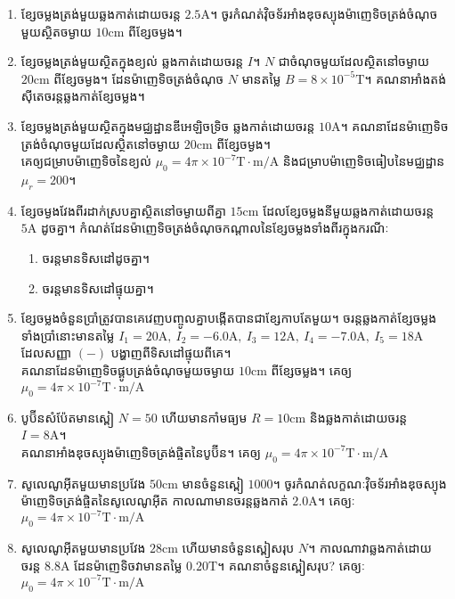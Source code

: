 \begin{enumerate}
	\item ខ្សែចម្លងត្រង់មួយឆ្លងកាត់ដោយចរន្ត $2.5\si{\ampere}$។ ចូរកំណត់វ៉ិចទ័រអាំងឌុចស្យុងម៉ាញេទិចត្រង់ចំណុចមួយស្ថិតចម្ងាយ $10\si{\centi\metre}$ ពីខ្សែចម្ងង។
	\item ខ្សែចម្លងត្រង់មួយស្ថិតក្នុងខ្យល់ ឆ្លងកាត់ដោយចរន្ត $I$។ $N$ ជាចំណុចមួយដែលស្ថិតនៅចម្ងាយ $20\si{\centi\metre}$ ពីខ្សែចម្ងង។ ដែនម៉ាញេទិចត្រង់ចំណុច $N$ មានតម្លៃ $B=8\times 10^{-5}\si{\tesla}$។ គណនាអាំងតង់ស៊ីតេចរន្តឆ្លងកាត់ខ្សែចម្លង។
	\item ខ្សែចម្លងត្រង់មួយស្ថិតក្នុងមជ្ឈដ្ឋានឌីអេឡិចទ្រិច ឆ្លងកាត់ដោយចរន្ត $10\si{\ampere}$។ គណនាដែនម៉ាញេទិចត្រង់ចំណុចមួយដែលស្ថិតនៅចម្ងាយ $20\si{\centi\metre}$ ពីខ្សែចម្ងង។\\ គេឲ្យជម្រាបម៉ាញេទិចនៃខ្យល់ $\mu_{0}=4\pi\times10^{-7}\si{\tesla\cdot\metre/\ampere}$ និងជម្រាបម៉ាញេទិចធៀបនៃមជ្ឈដ្ឋាន $\mu_{r}=200$។
	\item ខ្សែចម្ងងវែងពីរដាក់ស្របគ្នាស្ថិតនៅចម្ងាយពីគ្នា $15\si{\centi\metre}$ ដែលខ្សែចម្លងនីមួយឆ្លងកាត់ដោយចរន្ត $5\si{\ampere}$ ដូចគ្នា។ កំណត់ដែនម៉ាញេទិចត្រង់ចំណុចកណ្តាលនៃខ្សែចម្លងទាំងពីរក្នុងករណីៈ
	\begin{enumerate}[k,2]
		\item ចរន្តមានទិសដៅដូចគ្នា។
		\item ចរន្តមានទិសដៅផ្ទុយគ្នា។
	\end{enumerate}
	\item ខ្សែចម្លងចំនួនប្រាំត្រូវបានគេវេញបញ្ចូលគ្នាបង្កើតបានជាខ្សែកាបតែមួយ។ ចរន្តឆ្លងកាត់ខ្សែចម្លងទាំងប្រាំនោះមានតម្លៃ $I_{1}=20\si{\ampere},~I_{2}=-6.0\si{\ampere},~I_{3}=12\si{\ampere},~I_{4}=-7.0\si{\ampere},~I_{5}=18\si{\ampere}$ ដែលសញ្ញា $\left(-\right)$ បង្ហាញពីទិសដៅផ្ទុយពីគេ។\\ គណនាដែនម៉ាញេទិចផ្គូបត្រង់ចំណុចមួយចម្ងាយ $10\si{\centi\metre}$ ពីខ្សែចម្លង។ គេឲ្យ $\mu_{0}=4\pi\times10^{-7}\si{\tesla}\cdot\si{\metre/\ampere}$
	\item បូប៊ីនសំប៉ែតមានស្ពៀ $N=50$ ហើយមានកាំមធ្យម $R=10\si{\centi\metre}$ និងឆ្លងកាត់ដោយចរន្ត $I=8\si{\ampere}$។\\ គណនាអាំងឌុចស្យុងម៉ាញេទិចត្រង់ផ្ចិតនៃបូប៊ីន។ គេឲ្យ $\mu_{0}=4\pi\times10^{-7}\si{\tesla}\cdot\si{\metre/\ampere}$
	\item សូលេណូអ៊ីតមួយមានប្រវែង $50\si{\centi\metre}$ មានចំនួនស្ពៀ $1000$។ ចូរកំណត់លក្ខណៈវ៉ិចទ័រអាំងឌុចស្យុងម៉ាញេទិចត្រង់ផ្ចិតនៃសូលេណូអ៊ីត កាលណាមានចរន្តឆ្លងកាត់ $2.0\si{\ampere}$។ គេឲ្យៈ $\mu_{0}=4\pi\times10^{-7}\si{\tesla}\cdot\si{\metre/\ampere}$
	\item សូលេណូអ៊ីតមួយមានប្រវែង $28\si{\centi\metre}$ ហើយមានចំនួនស្ពៀសរុប $N$។ កាលណាវាឆ្លងកាត់ដោយចរន្ត $8.8\si{\ampere}$ ដែនម៉ាញេទិចវាមានតម្លៃ $0.20\si{\tesla}$។ គណនាចំនួនស្ពៀសរុប? គេឲ្យៈ $\mu_{0}=4\pi\times10^{-7}\si{\tesla}\cdot\si{\metre/\ampere}$

\end{enumerate}

